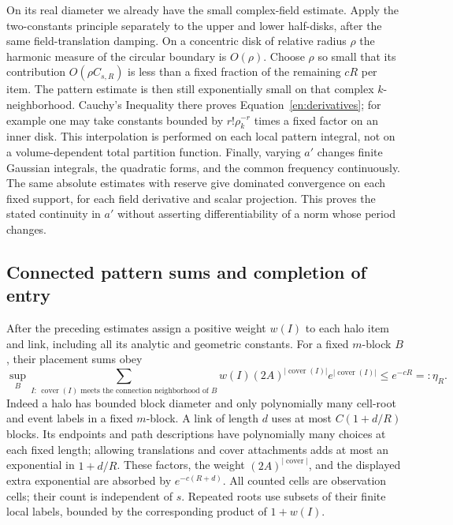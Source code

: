 On its real diameter we already have the small complex-field estimate.
Apply the two-constants principle separately to the upper and lower
half-disks, after the same field-translation damping.  On a concentric
disk of relative radius $\rho$ the harmonic measure of the circular
boundary is $O(\rho)$.  Choose $\rho$ so small that its contribution
$O(\rho C_{s,R})$ is less than a fixed fraction of the remaining
$cR$ per item.  The pattern estimate is then still exponentially small
on that complex $k$-neighborhood.  Cauchy's Inequality there proves
Equation~\eqref{en:derivatives}; for example one may take constants
bounded by $r!\rho_k^{-r}$ times a fixed factor on an inner disk.
This interpolation is performed on each local pattern integral, not
on a volume-dependent total partition function.  Finally, varying
$a'$ changes finite Gaussian integrals, the quadratic forms, and the
common frequency continuously.  The same absolute estimates with
reserve give dominated convergence on each fixed support, for each
field derivative and scalar projection.  This proves the stated
continuity in $a'$ without asserting differentiability of a norm
whose period changes.

\subsection{Connected pattern sums and completion of entry}

After the preceding estimates assign a positive weight $w(I)$ to each
halo item and link, including all its analytic and geometric constants.
For a fixed $m$-block $B$, their placement sums obey
\begin{equation}\label{en:placement}
 \sup_B\sum_{I:\,\operatorname{cover}(I)\text{ meets the
       connection neighborhood of }B}
       w(I)(2A)^{|\operatorname{cover}(I)|}
                         e^{|\operatorname{cover}(I)|}
                 \leq e^{-cR}=:\eta_R.
\end{equation}
Indeed a halo has bounded block diameter and only polynomially many
cell-root and event labels in a fixed $m$-block.  A link of length $d$
uses at most $C(1+d/R)$ blocks.  Its endpoints and path descriptions
have polynomially many choices at each fixed length; allowing
translations and cover attachments adds at most an exponential in
$1+d/R$.  These factors, the weight $(2A)^{|\operatorname{cover}|}$,
and the displayed extra exponential are absorbed by
$e^{-c(R+d)}$.  All counted cells are observation cells; their count
is independent of $s$.  Repeated roots use subsets of their finite
local labels, bounded by the corresponding product of $1+w(I)$.

